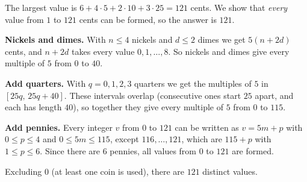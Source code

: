 The largest value is $6+4\cdot5+2\cdot10+3\cdot25=121$ cents. We show that \emph{every} value from $1$ to $121$ cents can be formed, so the answer is $121$.

\textbf{Nickels and dimes.} With $n\le4$ nickels and $d\le2$ dimes we get $5(n+2d)$ cents, and $n+2d$ takes every value $0,1,\dots,8$. So nickels and dimes give every multiple of $5$ from $0$ to $40$.

\textbf{Add quarters.} With $q=0,1,2,3$ quarters we get the multiples of $5$ in $[25q,\,25q+40]$. These intervals overlap (consecutive ones start $25$ apart, and each has length $40$), so together they give every multiple of $5$ from $0$ to $115$.

\textbf{Add pennies.} Every integer $v$ from $0$ to $121$ can be written as $v=5m+p$ with $0\le p\le4$ and $0\le 5m\le115$, except $116,\dots,121$, which are $115+p$ with $1\le p\le6$. Since there are $6$ pennies, all values from $0$ to $121$ are formed.

Excluding $0$ (at least one coin is used), there are $\boxed{121}$ distinct values.
